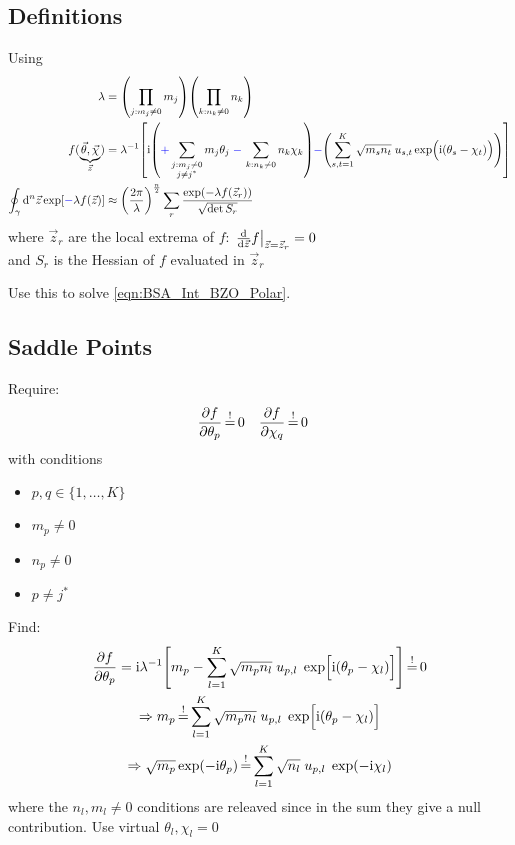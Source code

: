 \documentclass[
	english,
	a4paper,
	fontsize=10pt,
	parskip=half,
	titlepage=true,
	DIV=12,
	final
]{scrreprt}
\newcommand*{\Thus}{\ensuremath{\Rightarrow}\xspace}
\newcommand*{\iunit}{\ensuremath{\mathrm{i}}}
\newcommand*{\equalCond}{  \mathop{=}\limits^!  }
\begin{document}
\subsection{Definitions}
Using
\begin{align}
	\lambda
&=
	\qty( \prod_{j : m_j \neq 0} m_j )
	\qty( \prod_{k : n_k \neq 0} n_k )
\label{eqn:DefLambda}
\\
	f(
		\underbrace{ \vec{\theta}, \vec{\chi} }_{\vec{z}}
	)
&=
	\lambda^{-1}
	\qty[
		\iunit
		\qty(
			{\color{blue} +}
			\sum_{\substack{j : m_j \neq 0 \\ j \neq j^*}}
				m_j \theta_j \;
			{\color{blue} -} \,
			\sum_{k : n_k \neq 0}
				n_k \chi  _k
		)
	{\color{blue} -}
		\qty(
			\sum_{s,t=1}^{K}
			\sqrt{m_s n_t} \;
			u_{s,t}
			\exp(\Big.
				\iunit(\theta_s - \chi_t)
			)
		)
	]
\\
	\oint_{\gamma} \dd[n]{\vec{z}}
		\exp[{\color{blue} -}\lambda f(\vec{z})]
&\approx
	\qty( \frac
		{2\pi}
		{\lambda}
	)^{\frac{n}{2}}
	\sum_{r}
		\frac
		{\exp(-\lambda f(\vec{z}_r))}
		{\sqrt{\det S_r}}
\label{eqn:Def_SPA}
\end{align}
where $\vec{z}_r$ are the local extrema of $f$: $\eval{\dv{\vec{z}}f}_{\vec{z} = \vec{z}_r} = 0$\\
and $S_r$ is the Hessian of $f$ evaluated in $\vec{z}_r$

Use this to solve \ref{eqn:BSA_Int_BZO_Polar}.

\subsection{Saddle Points}
Require:
\begin{align}
	\pdv{f}{\theta_p} &\equalCond 0
&
	\pdv{f}{\chi  _q} &\equalCond 0 
\end{align}
with conditions
\begin{itemize}
\item $p, q \in \{1, \ldots, K\}$
\item $m_p \neq 0$
\item $n_p \neq 0$
\item $p \neq j^*$
\end{itemize}

Find:
\begin{gather}
	\pdv{f}{\theta_p}
=
	\iunit \lambda^{-1}
	\qty[
		m_p
		-
		\sum_{l=1}^{K}
			\sqrt{m_p n_l} \; u_{p,l} \; \exp[ \Big. \iunit(\theta_p - \chi_l)]
	]
	\label{eqn:Jacobiantheta}
\equalCond
	0 \\
\Thus
	m_p
\equalCond
	\sum_{l=1}^{K}
		\sqrt{m_p n_l} \; u_{p,l} \; \exp[ \Big. \iunit(\theta_p - \chi_l) ] \\
\Thus
	\sqrt{m_p} \exp(-\iunit \theta_p)
\equalCond
	\sum_{l=1}^{K} \sqrt{n_l} \; u_{p,l} \; \exp(-\iunit\chi_l)
	\label{eqn:FourierLinkForward}
\end{gather}
where the $n_l, m_l \neq 0$ conditions are releaved since in the sum they give a null contribution. Use virtual $\theta_l, \chi_l = 0$
\end{document}
